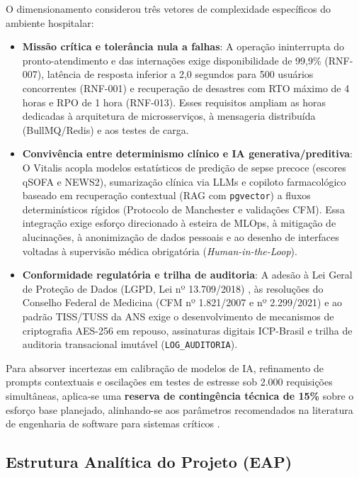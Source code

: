 O dimensionamento considerou três vetores de complexidade específicos do ambiente hospitalar:
\begin{itemize}[leftmargin=*]
    \item \textbf{Missão crítica e tolerância nula a falhas}: A operação ininterrupta do pronto-atendimento e das internações exige disponibilidade de 99,9\% (RNF-007), latência de resposta inferior a 2,0 segundos para 500 usuários concorrentes (RNF-001) e recuperação de desastres com RTO máximo de 4 horas e RPO de 1 hora (RNF-013). Esses requisitos ampliam as horas dedicadas à arquitetura de microsserviços, à mensageria distribuída (BullMQ/Redis) e aos testes de carga.
    \item \textbf{Convivência entre determinismo clínico e IA generativa/preditiva}: O Vitalis acopla modelos estatísticos de predição de sepse precoce (escores qSOFA e NEWS2), sumarização clínica via LLMs e copiloto farmacológico baseado em recuperação contextual (RAG com \texttt{pgvector}) a fluxos determinísticos rígidos (Protocolo de Manchester e validações CFM). Essa integração exige esforço direcionado à esteira de MLOps, à mitigação de alucinações, à anonimização de dados pessoais e ao desenho de interfaces voltadas à supervisão médica obrigatória (\textit{Human-in-the-Loop}).
    \item \textbf{Conformidade regulatória e trilha de auditoria}: A adesão à Lei Geral de Proteção de Dados (LGPD, Lei nº 13.709/2018) \cite{brasil_lgpd:2018}, às resoluções do Conselho Federal de Medicina (CFM nº 1.821/2007 e nº 2.299/2021) \cite{cfm_prontuario:2007, cfm_digital:2021} e ao padrão TISS/TUSS da ANS \cite{ans_tiss:2023} exige o desenvolvimento de mecanismos de criptografia AES-256 em repouso, assinaturas digitais ICP-Brasil e trilha de auditoria transacional imutável (\texttt{LOG\_AUDITORIA}).
\end{itemize}

Para absorver incertezas em calibração de modelos de IA, refinamento de prompts contextuais e oscilações em testes de estresse sob 2.000 requisições simultâneas, aplica-se uma \textbf{reserva de contingência técnica de 15\%} sobre o esforço base planejado, alinhando-se aos parâmetros recomendados na literatura de engenharia de software para sistemas críticos \cite{sommerville:2019}.

\subsection{Estrutura Analítica do Projeto (EAP)}

